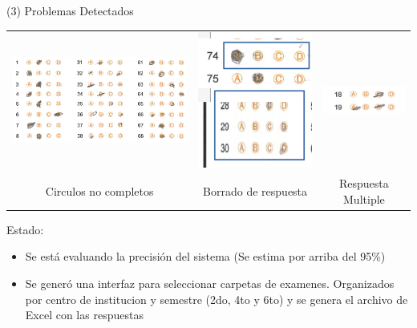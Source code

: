 \begin{frame}{\citetitle{\EntradaBibtex} (3)}
Problemas Detectados
\begin{center}
	\begin{tabular}{ccc}
		\includegraphics[width=0.35\linewidth]{2024_ProyectoCalificadorExamenes/figs/CasoFlojera.png}&
		\includegraphics[width=0.10\linewidth]{2024_ProyectoCalificadorExamenes/figs/CasosBorrosos.png} &
		\includegraphics[width=0.15\linewidth]{2024_ProyectoCalificadorExamenes/figs/RespuestaMultiple.png} \\
		Circulos no completos & Borrado de respuesta & Respuesta Multiple \\ 

	\end{tabular}
\end{center}
Estado:
\begin{itemize}
\item Se está evaluando la precisión del sistema (Se estima por arriba del 95\%)
\item Se generó una interfaz para seleccionar carpetas de examenes. Organizados por centro de institucion y semestre (2do, 4to y 6to) y se genera el archivo de Excel con las respuestas
\end{itemize}



\end{frame}

